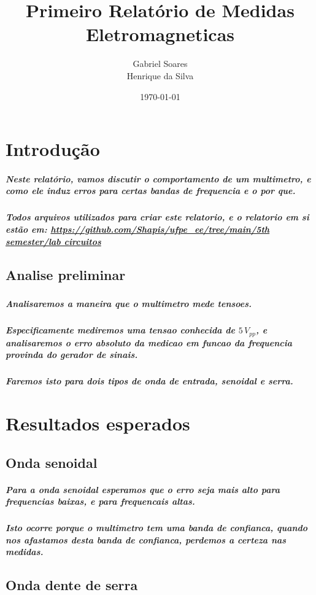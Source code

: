 \documentclass[12pt,twoside, a4paper, twocolumn]{article}
\title{Primeiro Relatório de Medidas Eletromagneticas}
\author{Gabriel Soares \\ Henrique da Silva}
\date{\today}
\begin{document}
\maketitle
{}
\newpage
\tableofcontents
\newpage



\section{Introdução}


\subparagraph*{Neste relatório, vamos discutir o comportamento de um multimetro, e como ele induz erros para certas bandas de frequencia e o por que.}

\subparagraph*{Todos arquivos utilizados para criar este relatorio, e o relatorio em si estão em:  \url{https://github.com/Shapis/ufpe_ee/tree/main/5th semester/lab circuitos}}




\subsection{Analise preliminar}
\subparagraph*{}


\subparagraph*{Analisaremos a maneira que o multimetro mede tensoes.}

\subparagraph*{Especificamente mediremos uma tensao conhecida de $5\,V_{pp}$, e analisaremos o erro absoluto da medicao em funcao da frequencia provinda do gerador de sinais.}

\subparagraph*{Faremos isto para dois tipos de onda de entrada, senoidal e serra.}

\section{Resultados esperados}

\subsection{Onda senoidal}

\subparagraph*{Para a onda  senoidal esperamos que o erro seja mais alto para frequencias baixas, e para frequencais altas.}

\subparagraph*{Isto ocorre porque o multimetro tem uma banda de confianca, quando nos afastamos desta banda de confianca, perdemos a certeza nas medidas.}

\subsection{Onda dente de serra}
\end{document}
